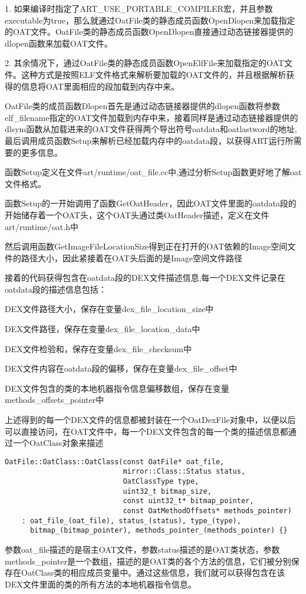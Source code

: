 1. 如果编译时指定了ART\_USE\_PORTABLE\_COMPILER宏，并且参数executable为true，那么就通过OatFile类的静态成员函数OpenDlopen来加载指定的OAT文件。OatFile类的静态成员函数OpenDlopen直接通过动态链接器提供的dlopen函数来加载OAT文件。

2. 其余情况下，通过OatFile类的静态成员函数OpenElfFile来加载指定的OAT文件。这种方式是按照ELF文件格式来解析要加载的OAT文件的，并且根据解析获得的信息将OAT里面相应的段加载到内存中来。

OatFile类的成员函数Dlopen首先是通过动态链接器提供的dlopen函数将参数elf\_filename指定的OAT文件加载到内存中来，接着同样是通过动态链接器提供的dlsym函数从加载进来的OAT文件获得两个导出符号oatdata和oatlastword的地址,最后调用成员函数Setup来解析已经加载内存中的oatdata段，以获得ART运行所需要的更多信息。

函数Setup定义在文件art/runtime/oat\_file.cc中,通过分析Setup函数更好地了解oat文件格式。

函数Setup的一开始调用了函数GetOatHeader，因此OAT文件里面的oatdata段的开始储存着一个OAT头，这个OAT头通过类OatHeader描述，定义在文件art/runtime/oat.h中

然后调用函数GetImageFileLocationSize得到正在打开的OAT依赖的Image空间文件的路径大小，因此紧接着在OAT头后面的是Image空间文件路径

接着的代码获得包含在oatdata段的DEX文件描述信息,每一个DEX文件记录在oatdata段的描述信息包括：

DEX文件路径大小，保存在变量dex\_file\_location\_size中

DEX文件路径，保存在变量dex\_file\_location\_data中

DEX文件检验和，保存在变量dex\_file\_checksum中

DEX文件内容在oatdata段的偏移，保存在变量dex\_file\_offset中

DEX文件包含的类的本地机器指令信息偏移数组，保存在变量methods\_offsets\_pointer中

上述得到的每一个DEX文件的信息都被封装在一个OatDexFile对象中，以便以后可以直接访问，在OAT文件中，每一个DEX文件包含的每一个类的描述信息都通过一个OatClass对象来描述
\begin{lstlisting}
OatFile::OatClass::OatClass(const OatFile* oat_file,
                            mirror::Class::Status status,
                            OatClassType type,
                            uint32_t bitmap_size,
                            const uint32_t* bitmap_pointer,
                            const OatMethodOffsets* methods_pointer)
    : oat_file_(oat_file), status_(status), type_(type),
      bitmap_(bitmap_pointer), methods_pointer_(methods_pointer) {}
\end{lstlisting}
参数oat\_file描述的是宿主OAT文件，参数status描述的是OAT类状态，参数methods\_pointer是一个数组，描述的是OAT类的各个方法的信息，它们被分别保存在OatClass类的相应成员变量中。通过这些信息，我们就可以获得包含在该DEX文件里面的类的所有方法的本地机器指令信息。
